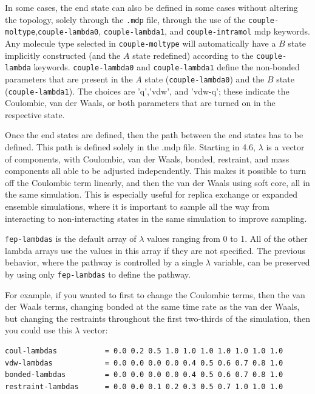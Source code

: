 In some cases, the end state can also be defined in some cases without
altering the topology, solely through the {\tt .mdp} file, through the use
of the {\tt couple-moltype},{\tt couple-lambda0}, {\tt couple-lambda1}, and
{\tt couple-intramol} mdp keywords.  Any molecule type selected in
{\tt couple-moltype} will automatically have a $B$ state implicitly
constructed (and the $A$ state redefined) according to the {\tt couple-lambda}
keywords. {\tt couple-lambda0} and {\tt couple-lambda1} define the non-bonded
parameters that are present in the $A$ state ({\tt couple-lambda0})
and the $B$ state ({\tt couple-lambda1}).  The choices are 'q','vdw', and
'vdw-q'; these indicate the Coulombic, van der Waals, or both parameters
that are turned on in the respective state.

Once the end states are defined, then the path between the end states
has to be defined. This path is defined solely in the .mdp file.
Starting in 4.6, $\lambda$ is a vector of components, with Coulombic,
van der Waals, bonded, restraint, and mass components all able to be
adjusted independently.  This makes it possible to turn off the
Coulombic term linearly, and then the van der Waals using soft core,
all in the same simulation.  This is especially useful for replica
exchange or expanded ensemble simulations, where it is important to
sample all the way from interacting to non-interacting states in the
same simulation to improve sampling.

{\tt fep-lambdas} is the default array of $\lambda$ values ranging
from 0 to 1.  All of the other lambda arrays use the values in this
array if they are not specified.  The previous behavior, where the
pathway is controlled by a single $\lambda$ variable, can be preserved
by using only {\tt fep-lambdas} to define the pathway.

For example, if you wanted to first to change the Coulombic terms,
then the van der Waals terms, changing bonded at the same time rate as
the van der Waals, but changing the restraints throughout the first
two-thirds of the simulation, then you could use this $\lambda$ vector:

\begin{verbatim}
coul-lambdas           = 0.0 0.2 0.5 1.0 1.0 1.0 1.0 1.0 1.0 1.0
vdw-lambdas            = 0.0 0.0 0.0 0.0 0.4 0.5 0.6 0.7 0.8 1.0
bonded-lambdas         = 0.0 0.0 0.0 0.0 0.4 0.5 0.6 0.7 0.8 1.0
restraint-lambdas      = 0.0 0.0 0.1 0.2 0.3 0.5 0.7 1.0 1.0 1.0
\end{verbatim}

